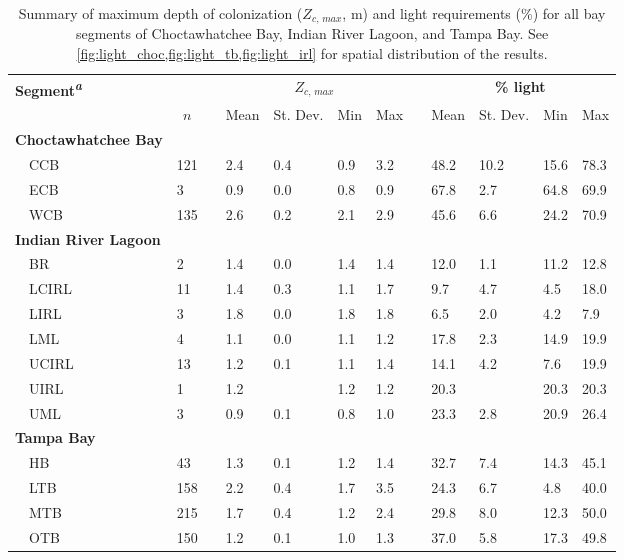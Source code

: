 \documentclass[letterpaper,12pt,oneside]{article}\usepackage[]{graphicx}\usepackage[]{color}
\begin{document}
\begin{table}[!tbp]
{\small
\caption{Summary of maximum depth of colonization ($Z_{c,\,max}$, m) and light requirements (\%) for all bay segments of Choctawhatchee Bay, Indian River Lagoon, and Tampa Bay.  See \cref{fig:light_choc,fig:light_tb,fig:light_irl} for spatial distribution of the results.\label{tab:light_summ}} 
\begin{center}
\begin{tabular}{llcllllcllll}
\hline\hline
\multicolumn{1}{l}{\bfseries Segment\textsuperscript{\textit{a}}}&\multicolumn{1}{c}{\bfseries }&\multicolumn{1}{c}{\bfseries }&\multicolumn{4}{c}{\bfseries {\bf $Z_{c,\,max}$}}&\multicolumn{1}{c}{\bfseries }&\multicolumn{4}{c}{\bfseries \% light}\tabularnewline
\cline{4-7} \cline{9-12}
\multicolumn{1}{l}{}&\multicolumn{1}{c}{$n$}&\multicolumn{1}{c}{}&\multicolumn{1}{c}{Mean}&\multicolumn{1}{c}{St. Dev.}&\multicolumn{1}{c}{Min}&\multicolumn{1}{c}{Max}&\multicolumn{1}{c}{}&\multicolumn{1}{c}{Mean}&\multicolumn{1}{c}{St. Dev.}&\multicolumn{1}{c}{Min}&\multicolumn{1}{c}{Max}\tabularnewline
\hline
{\bfseries Choctawhatchee Bay}&&&&&&&&&&&\tabularnewline
~~CCB&121&&2.4&0.4&0.9&3.2&&48.2&10.2&15.6&78.3\tabularnewline
~~ECB&3&&0.9&0.0&0.8&0.9&&67.8& 2.7&64.8&69.9\tabularnewline
~~WCB&135&&2.6&0.2&2.1&2.9&&45.6& 6.6&24.2&70.9\tabularnewline
\hline
{\bfseries Indian River Lagoon}&&&&&&&&&&&\tabularnewline
~~BR&2&&1.4&0.0&1.4&1.4&&12.0& 1.1&11.2&12.8\tabularnewline
~~LCIRL&11&&1.4&0.3&1.1&1.7&& 9.7& 4.7& 4.5&18.0\tabularnewline
~~LIRL&3&&1.8&0.0&1.8&1.8&& 6.5& 2.0& 4.2& 7.9\tabularnewline
~~LML&4&&1.1&0.0&1.1&1.2&&17.8& 2.3&14.9&19.9\tabularnewline
~~UCIRL&13&&1.2&0.1&1.1&1.4&&14.1& 4.2& 7.6&19.9\tabularnewline
~~UIRL&1&&1.2& &1.2&1.2&&20.3& &20.3&20.3\tabularnewline
~~UML&3&&0.9&0.1&0.8&1.0&&23.3& 2.8&20.9&26.4\tabularnewline
\hline
{\bfseries Tampa Bay}&&&&&&&&&&&\tabularnewline
~~HB&43&&1.3&0.1&1.2&1.4&&32.7& 7.4&14.3&45.1\tabularnewline
~~LTB&158&&2.2&0.4&1.7&3.5&&24.3& 6.7& 4.8&40.0\tabularnewline
~~MTB&215&&1.7&0.4&1.2&2.4&&29.8& 8.0&12.3&50.0\tabularnewline
~~OTB&150&&1.2&0.1&1.0&1.3&&37.0& 5.8&17.3&49.8\tabularnewline
\hline
\end{tabular}\end{center}}


\end{table}
\end{document}
